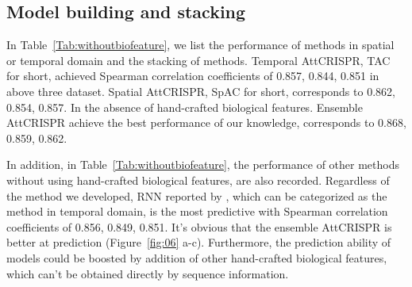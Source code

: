 \documentclass{bioinfo}
\begin{document}
\subsection{Model building and stacking}\label{section:stacking}

In Table~\ref{Tab:withoutbiofeature}, we list the performance of methods in spatial or temporal domain and the stacking of methods. 
Temporal AttCRISPR, TAC for short, achieved Spearman correlation coefficients of 0.857, 0.844, 0.851 in above three dataset. 
Spatial AttCRISPR, SpAC for short, corresponds to 0.862, 0.854, 0.857. In the absence of hand-crafted biological features. 
Ensemble AttCRISPR achieve the best performance of our knowledge, corresponds to 0.868, 0.859, 0.862. 

In addition, in Table~\ref{Tab:withoutbiofeature}, the performance of other methods without using hand-crafted biological features, are also recorded. 
Regardless of the method we developed, RNN reported by \citeauthor{wang2019optimized}, which can be categorized as the method in temporal domain, 
is the most predictive with Spearman correlation coefficients of 0.856, 0.849, 0.851. 
It's obvious that the ensemble AttCRISPR is better at prediction (Figure~\ref{fig:06} a-c). 
Furthermore, the prediction ability of models could be boosted by addition of other hand-crafted biological features, which can't be obtained directly by sequence information. 
\end{document}
